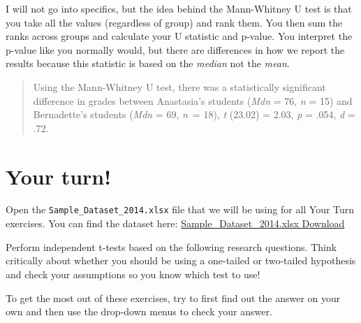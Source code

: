 \documentclass[
]{book}
\begin{document}
I will not go into specifics, but the idea behind the Mann-Whitney U test is that you take all the values (regardless of group) and rank them. You then sum the ranks across groups and calculate your U statistic and p-value. You interpret the p-value like you normally would, but there are differences in how we report the results because this statistic is based on the \emph{median} not the \emph{mean}.

\begin{quote}
Using the Mann-Whitney U test, there was a statistically significant difference in grades between Anastasia's students (\emph{Mdn} = 76, \emph{n} = 15) and Bernadette's students (\emph{Mdn} = 69, \emph{n}~= 18), \emph{t} (23.02) = 2.03, \emph{p} = .054, \emph{d} = .72.
\end{quote}

\hypertarget{your-turn}{%
\section{Your turn!}\label{your-turn}}

Open the \texttt{Sample\_Dataset\_2014.xlsx} file that we will be using for all Your Turn exercises. You can find the dataset here: \href{https://github.com/danawanzer/stats-with-jamovi/blob/master/data/Sample_Dataset_2014.xlsx}{Sample\_Dataset\_2014.xlsx Download}

Perform independent t-tests based on the following research questions. Think critically about whether you should be using a one-tailed or two-tailed hypothesis and check your assumptions so you know which test to use!

To get the most out of these exercises, try to first find out the answer on your own and then use the drop-down menus to check your answer.
\end{document}
